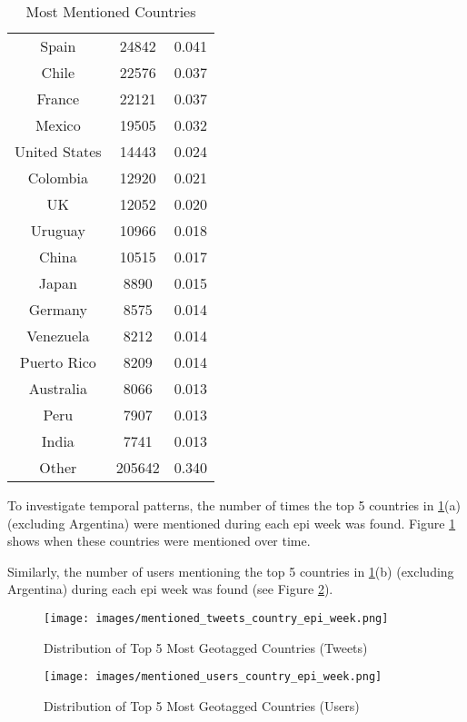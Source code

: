 \begin{table}[H]
\begin{subtable}[c]{0.5\textwidth}
\begin{tabular}{|c|c|c|}
    Spain & 24842 & 0.041 \\
    Chile & 22576 & 0.037 \\
    France & 22121 & 0.037 \\
    Mexico & 19505 & 0.032 \\
    United States & 14443 & 0.024 \\
    Colombia & 12920 & 0.021 \\
    UK & 12052 & 0.020 \\
    Uruguay & 10966 & 0.018 \\
    China & 10515 & 0.017 \\
    Japan & 8890 & 0.015 \\
    Germany & 8575 & 0.014 \\
    Venezuela & 8212 & 0.014 \\
    Puerto Rico & 8209 & 0.014 \\
    Australia & 8066 & 0.013 \\
    Peru & 7907 & 0.013 \\
    India & 7741 & 0.013 \\
    Other & 205642 & 0.340 \\
    \hline
    \end{tabular}
\label{table:mentioned-countries}
\end{subtable}
\caption{Most Mentioned Countries}
\end{table}

To investigate temporal patterns, the number of times the top 5 countries in \ref{table:mentioned-countries}(a) (excluding Argentina) were mentioned during each epi week was found. Figure \ref{fig:mentioned-tweets-country-epi-week} shows when these countries were mentioned over time.

Similarly, the number of users mentioning the top 5 countries in \ref{table:mentioned-countries}(b) (excluding Argentina) during each epi week was found (see Figure \ref{fig:mentioned-users-country-epi-week}).

\begin{figure}[H]
    \centering
    \texttt{[image: images/mentioned\_tweets\_country\_epi\_week.png]}
    
    \caption{Distribution of Top 5 Most Geotagged Countries (Tweets)}
    \label{fig:mentioned-tweets-country-epi-week}
\end{figure}

\begin{figure}[H]
    \centering
    \texttt{[image: images/mentioned\_users\_country\_epi\_week.png]}
    
    \caption{Distribution of Top 5 Most Geotagged Countries (Users)}
    \label{fig:mentioned-users-country-epi-week}
\end{figure}

